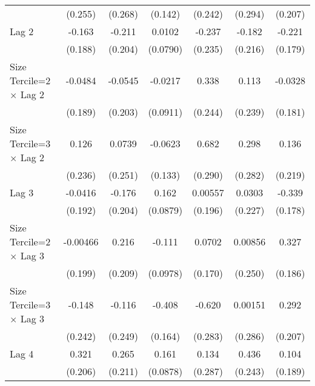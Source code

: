 \begin{table}[htbp]
\begin{tabular}{l*{6}{c}}
                &  (0.255)         &  (0.268)         &  (0.142)         &  (0.242)         &  (0.294)         &  (0.207)         \\
\addlinespace
Lag 2           &   -0.163         &   -0.211         &   0.0102         &   -0.237         &   -0.182         &   -0.221         \\
                &  (0.188)         &  (0.204)         & (0.0790)         &  (0.235)         &  (0.216)         &  (0.179)         \\
\addlinespace
Size Tercile=2 $\times$ Lag 2&  -0.0484         &  -0.0545         &  -0.0217         &    0.338         &    0.113         &  -0.0328         \\
                &  (0.189)         &  (0.203)         & (0.0911)         &  (0.244)         &  (0.239)         &  (0.181)         \\
\addlinespace
Size Tercile=3 $\times$ Lag 2&    0.126         &   0.0739         &  -0.0623         &    0.682\sym{*}  &    0.298         &    0.136         \\
                &  (0.236)         &  (0.251)         &  (0.133)         &  (0.290)         &  (0.282)         &  (0.219)         \\
\addlinespace
Lag 3           &  -0.0416         &   -0.176         &    0.162         &  0.00557         &   0.0303         &   -0.339         \\
                &  (0.192)         &  (0.204)         & (0.0879)         &  (0.196)         &  (0.227)         &  (0.178)         \\
\addlinespace
Size Tercile=2 $\times$ Lag 3& -0.00466         &    0.216         &   -0.111         &   0.0702         &  0.00856         &    0.327         \\
                &  (0.199)         &  (0.209)         & (0.0978)         &  (0.170)         &  (0.250)         &  (0.186)         \\
\addlinespace
Size Tercile=3 $\times$ Lag 3&   -0.148         &   -0.116         &   -0.408\sym{*}  &   -0.620\sym{*}  &  0.00151         &    0.292         \\
                &  (0.242)         &  (0.249)         &  (0.164)         &  (0.283)         &  (0.286)         &  (0.207)         \\
\addlinespace
Lag 4           &    0.321         &    0.265         &    0.161         &    0.134         &    0.436         &    0.104         \\
                &  (0.206)         &  (0.211)         & (0.0878)         &  (0.287)         &  (0.243)         &  (0.189)         \\

\end{tabular}
\end{table}
